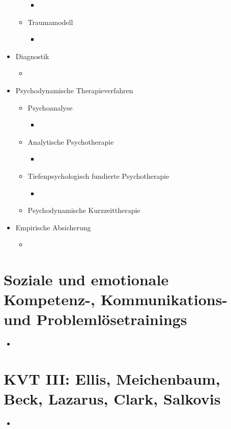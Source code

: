 \documentclass[11pt, paper=a4, twocolumn]{scrartcl}
\begin{document}
\begin{itemize}
\begin{itemize}
						\begin{itemize}
							\item 
						\end{itemize}
					\item Traumamodell
						\begin{itemize}
							\item 
						\end{itemize}
				\end{itemize}
			\item Diagnostik
				\begin{itemize}
					\item 
				\end{itemize}
			\item Psychodynamische Therapieverfahren
				\begin{itemize}
					\item Psychoanalyse
						\begin{itemize}
							\item 
						\end{itemize}
					\item Analytische Psychotherapie
						\begin{itemize}
							\item 
						\end{itemize}
					\item Tiefenpsychologisch fundierte Psychotherapie
						\begin{itemize}
							\item 
						\end{itemize}
					\item Psychodynamische Kurzzeittherapie
				\end{itemize}
			\item Empirische Absicherung
				\begin{itemize}
					\item 
				\end{itemize}
		\end{itemize}

	\section{Soziale und emotionale Kompetenz-, Kommunikations- und Problemlösetrainings}
		\begin{itemize}
			\item 
		\end{itemize}

	\section{KVT III: Ellis, Meichenbaum, Beck, Lazarus, Clark, Salkovis}
		\begin{itemize}
			\item 
		\end{itemize}
\end{document}
